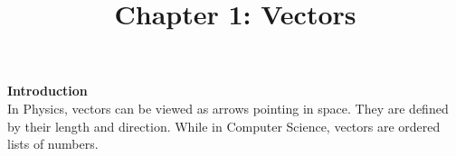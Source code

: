 \documentclass{article}
\title{Chapter 1: Vectors}
\begin{document}
  \maketitle
  \textbf{Introduction}\\
  In Physics, vectors can be viewed as arrows pointing in space. They are defined by their length and direction. While in Computer Science, vectors are ordered lists of numbers.
\end{document}
